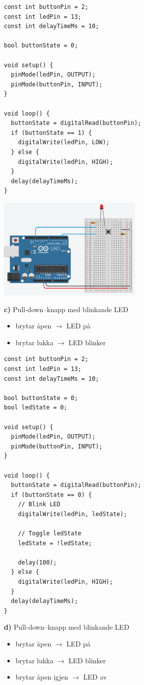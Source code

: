 \documentclass[12pt,a4paper]{article}
\begin{document}
  \begin{lstlisting}[language=Arduino, basicstyle=\tiny]
const int buttonPin = 2;
const int ledPin = 13;
const int delayTimeMs = 10;

bool buttonState = 0;

void setup() {
  pinMode(ledPin, OUTPUT);
  pinMode(buttonPin, INPUT);
}

void loop() {
  buttonState = digitalRead(buttonPin);
  if (buttonState == 1) {
    digitalWrite(ledPin, LOW);
  } else {
    digitalWrite(ledPin, HIGH);
  }
  delay(delayTimeMs);
}
  \end{lstlisting}
  \begin{center}
    \includegraphics[width=200pt]{01_1_b.png}
  \end{center}

  \newpage
  \textbf{c)}
  Pull-down--knapp med blinkande LED
  \begin{itemize}
    \item brytar åpen $\rightarrow$ LED på
    \item brytar lukka $\rightarrow$ LED blinker
  \end{itemize}

  \begin{lstlisting}[language=Arduino, basicstyle=\tiny]
const int buttonPin = 2;
const int ledPin = 13;
const int delayTimeMs = 10;

bool buttonState = 0;
bool ledState = 0;

void setup() {
  pinMode(ledPin, OUTPUT);
  pinMode(buttonPin, INPUT);
}

void loop() {
  buttonState = digitalRead(buttonPin);
  if (buttonState == 0) {
    // Blink LED
    digitalWrite(ledPin, ledState);

    // Toggle ledState
    ledState = !ledState;

    delay(100);
  } else {
    digitalWrite(ledPin, HIGH);
  }
  delay(delayTimeMs);
}
  \end{lstlisting}
    
  \textbf{d)}
  Pull-down--knapp med blinkande LED
  \begin{itemize}
    \item brytar åpen $\rightarrow$ LED på
    \item brytar lukka $\rightarrow$ LED blinker
    \item brytar åpen igjen $\rightarrow$ LED av
  \end{itemize}
\end{document}

